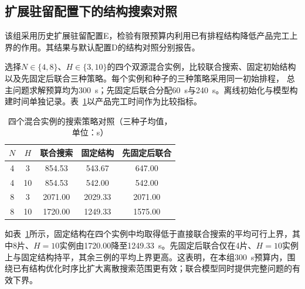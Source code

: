 \subsection{扩展驻留配置下的结构搜索对照}
\label{sec:structure-comparison-cn}

该组采用历史扩展驻留配置E，检验有限预算内利用已有排程结构降低产品完工上界的作用。其结果与默认配置D的结构对照分别报告。

选择$N\in\{4,8\}$、$H\in\{3,10\}$的四个双源混合实例，比较联合搜索、固定初始结构以及先固定后联合三种策略。每个实例和种子的三种策略采用同一初始排程，
总主问题求解预算均为300~s；先固定后联合分配60~s与240~s。离线初始化与模型构建时间单独记录。表~\ref{tab:structure-ablation-cn}以产品完工时间作为比较指标。

\begin{table}[!htbp]
\centering\small
\caption{四个混合实例的搜索策略对照（三种子均值，单位：s）}
\label{tab:structure-ablation-cn}
\begin{tabular}{ccccc}\toprule
$N$ & $H$ & 联合搜索 & 固定结构 & 先固定后联合\\\midrule
4 & 3 & 854.53 & 543.67 & 647.00\\
4 & 10 & 854.53 & 542.00 & 542.00\\
8 & 3 & 2071.00 & 2029.33 & 2071.00\\
8 & 10 & 1720.00 & 1249.33 & 1575.00\\
\bottomrule\end{tabular}
\end{table}

如表~\ref{tab:structure-ablation-cn}所示，固定结构在四个实例中均取得低于直接联合搜索的平均可行上界，其中8片、$H=10$实例由1720.00降至1249.33~s。先固定后联合仅在4片、$H=10$实例上与固定结构持平，其余三例的平均上界更高。这表明，在本组300~s预算内，围绕已有结构优化时序比扩大离散搜索范围更有效；联合模型同时提供完整问题的有效下界。


